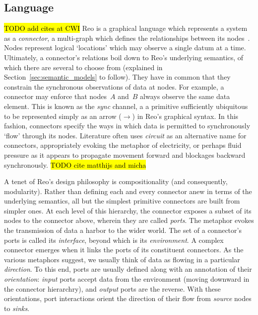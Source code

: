 \subsection{Language}
\label{sec:reo_lang}
\hl{TODO add cites at CWI}
Reo is a graphical language which represents a system as a \textit{connector}, a multi-graph which defines the relationships between its nodes~\cite{arbab2011puff}. Nodes represent logical `locations' which may observe a single datum at a time. Ultimately, a connector's relations boil down to Reo's underlying semantics, of which there are several to choose from (explained in Section~\ref{sec:semantic_models} to follow). They have in common that they constrain the synchronous observations of data at nodes. For example, a connector may enforce that nodes~$A$ and~$B$ always observe the same data element. This is known as the \textit{sync} channel, a a primitive sufficiently ubiquitous to be represented simply as an arrow ($\longrightarrow$) in Reo's graphical syntax. In this fashion, connectors specify the ways in which data is permitted to synchronously `flow' through its nodes. Literature often uses \textit{circuit} as an alternative name for connectors, appropriately evoking the metaphor of electricity, or perhaps fluid pressure as it appears to propagate movement forward and blockages backward synchronously.
\hl{TODO cite matthijs and micha} 

A tenet of Reo's design philosophy is compositionality (and consequently, modularity). Rather than defining each and every connector anew in terms of the underlying semantics, all but the simplest primitive connectors are built from simpler ones. At each level of this hierarchy, the connector exposes a subset of its nodes to the connector above, wherein they are called \textit{ports}. The metaphor evokes the transmission of data a harbor to the wider world. The set of a connector's ports is called its \textit{interface}, beyond which is its \textit{environment}. A complex connector emerges when it links the ports of its constituent connectors. As the various metaphors suggest, we usually think of data as flowing in a particular \textit{direction}. To this end, ports are usually defined along with an annotation of their \textit{orientation}: \textit{input} ports accept data from the environment (moving downward in the connector hierarchry), and \textit{output} ports are the reverse. With these orientations, port interactions orient the direction of their flow from \textit{source} nodes to \textit{sinks}.

